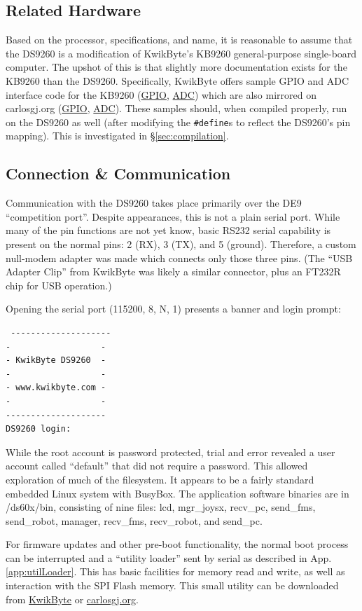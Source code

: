 \documentclass[]{article}
\begin{document}
\subsection{Related Hardware}
\label{sec:related_hardware}
\par Based on the processor, specifications, and name, it is reasonable to assume that the DS9260 is a modification of KwikByte's KB9260 general-purpose single-board computer. The upshot of this is that slightly more documentation exists for the KB9260 than the DS9260. Specifically, KwikByte offers sample GPIO and ADC interface code for the KB9260 (\href{http://kwikbyte.com/KB9260/source/gpio.zip}{GPIO}, \href{http://kwikbyte.com/KB9260/source/adc.zip}{ADC}) which are also mirrored on carlosgj.org (\href{http://carlosgj.org/FRC/DS9260/gpio.zip}{GPIO}, \href{http://carlosgj.org/FRC/DS9260/adc.zip}{ADC}). These samples should, when compiled properly, run on the DS9260 as well (after modifying the \texttt{\#define}s to reflect the DS9260's pin mapping). This is investigated in \S\ref{sec:compilation}.
\subsection{Connection \& Communication}
\label{sec:communication}
\par Communication with the DS9260 takes place primarily over the DE9 ``competition port''. Despite appearances, this is not a plain serial port. While many of the pin functions are not yet know, basic RS232 serial capability is present on the normal pins: 2 (RX), 3 (TX), and 5 (ground). Therefore, a custom null-modem adapter was made which connects only those three pins. (The ``USB Adapter Clip'' from KwikByte was likely a similar connector, plus an FT232R chip for USB operation.)
\par Opening the serial port (115200, 8, N, 1) presents a banner and login prompt:
\begin{verbatim}
 --------------------
-                  -
- KwikByte DS9260  -
-                  -
- www.kwikbyte.com -
-                  -
--------------------
DS9260 login:
\end{verbatim}
While the root account is password protected, trial and error revealed a user account called ``default'' that did not require a  password. This allowed exploration of much of the filesystem. It appears to be a fairly standard embedded Linux system with BusyBox. The application software binaries are in /ds60x/bin, consisting of nine files: lcd, mgr\_joysx, recv\_pc, send\_fms, send\_robot, manager, recv\_fms, recv\_robot, and send\_pc.
\par For firmware updates and other pre-boot functionality, the normal boot process can be interrupted and a ``utility loader'' sent by serial as described in App. \ref{app:utilLoader}. This has basic facilities for memory read and write, as well as interaction with the SPI Flash memory. This small utility can be downloaded from \href{http://www.kwikbyte.com/driverstation/binary/utilLoader.bin}{KwikByte} or \href{http://carlosgj.org/FRC/DS9260/utilLoader.bin}{carlosgj.org}.
\end{document}
